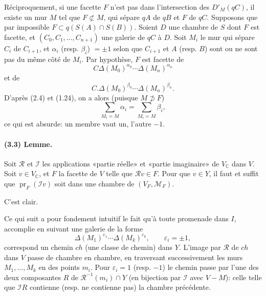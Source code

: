 \documentclass[10pt,a4paper]{article}
\newcommand{\C}{\mathbb C}
\newcommand{\mcR}{\mathcal R}
\newcommand{\mcI}{\mathcal I}
\begin{document}
Réciproquement, si une facette \(F\) n'est pas dans l'intersection des \(D'_M(qC)\), il existe un mur \(M\) tel que \(F\not\subset M\), qui sépare \(qA\) de \(qB\) et \(F\) de \(qC\). Supposons que par impossible \(F\subset q(S(A)\cap S(B))\). Soient \(D\) une chambre de \(S\) dont \(F\) est facette, et \((C_0,C_1,\ldots,C_{n+1})\) une galerie de \(qC\) à \(D\). Soit \(M_i\) le mur qui sépare \(C_i\) de \(C_{i+1}\), et \(\alpha_i\) (resp. \(\beta_i\)) \(=\pm1\) selon que \(C_{i+1}\) et \(A\) (resp. \(B\)) sont ou ne sont pas du même côté de \(M_i\). Par hypothèse, \(F\) est facette de
\[
C\Delta(M_0)^{\alpha_0}\cdots \Delta(M_n)^{\alpha_n}
\]
et de
\[
C.\Delta(M_0)^{\beta_0}\cdots \Delta(M_n)^{\beta_n}.
\]
D'après (2.4) et (1.24), on a alors (puisque \(M\not\supset F\))
\[
\sum_{M_i=M}\alpha_i=\sum_{M_i=M}\beta_i,
\]
ce qui est absurde: un membre vaut un, l'autre \(-1\).

\paragraph{(3.3) Lemme.} Soit \(\mcR\) et \(\mcI\) les applications «partie réelle» et «partie imaginaire» de \(V_\C\) dans \(V\). Soit \(v\in V_\C\), et \(F\) la facette de \(V\) telle que \(\mcR v\in F\). Pour que \(v\in Y\), il faut et suffit que \(\operatorname{pr}_F(\mcI v)\) soit dans une chambre de \((V_F,\mathcal M_F)\).

C'est clair.

Ce qui suit a pour fondement intuitif le fait qu'à toute promenade dans \(I\), accomplie en suivant une galerie de la forme
\[
\Delta(M_1)^{\varepsilon_1}\cdots \Delta(M_k)^{\varepsilon_k},\qquad \varepsilon_i=\pm1,
\]
correspond un chemin \(ch\) (une classe de chemin) dans \(Y\). L'image par \(\mcR\) de \(ch\) dans \(V\) passe de chambre en chambre, en traversant successivement les murs \(M_1,\ldots,M_k\) en des points \(m_i\). Pour \(\varepsilon_i=1\) (resp. \(-1\)) le chemin passe par l'une des deux composantes \(R\) de \(\mcR^{-1}(m_i)\cap Y\) (en bijection par \(\mcI\) avec \(V-M\)): celle telle que \(\mcI R\) contienne (resp. ne contienne pas) la chambre précédente.
\end{document}
